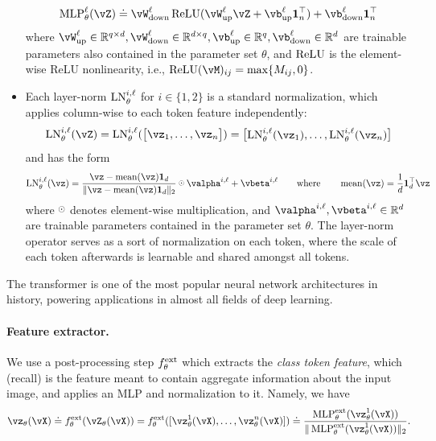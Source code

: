 \documentclass[../../book-main.tex]{subfiles}
\begin{document}
\begin{itemize}
    \begin{equation}
        \MLP_{\theta}^{\ell}(\vZ) \doteq \vW_{\down}^{\ell}\ReLU(\vW_{\up}^{\ell}\vZ + \vb_{\up}^{\ell}\vone_{n}^{\top}) + \vb_{\down}^{\ell}\vone_{n}^{\top}
    \end{equation}
    where \(\vW_{\up}^{\ell} \in \R^{q \times d}, \vW_{\down}^{\ell} \in \R^{d \times q}, \vb_{\up}^{\ell} \in \R^{q}, \vb_{\down}^{\ell} \in \R^{d}\) are trainable parameters also contained in the parameter set \(\theta\), and \(\operatorname{ReLU}\) is the element-wise ReLU nonlinearity, i.e., \(\ReLU(\vM)_{ij} = \max\{M_{ij}, 0\}\). 
    \item Each layer-norm \(\operatorname{LN}_{\theta}^{i, \ell}\) for \(i \in \{1, 2\}\) is a standard normalization, which applies column-wise to each token feature independently:
    \begin{equation}
        \LN_{\theta}^{i, \ell}(\vZ) = \LN_{\theta}^{i, \ell}(\mat{\vz_{1}, \dots, \vz_{n}}) = \mat{\LN_{\theta}^{i, \ell}(\vz_{1}), \dots, \LN_{\theta}^{i, \ell}(\vz_{n})}
    \end{equation}
    and has the form 
    \begin{equation}
        \LN_{\theta}^{i, \ell}(\vz) = \frac{\vz
        - \operatorname{mean}(\vz)\vone_{d}}{\norm{\vz
        - \operatorname{mean}(\vz)\vone_{d}}_{2}} \hada \valpha^{i, \ell} + \vbeta^{i, \ell} \qquad \text{where} \qquad \operatorname{mean}(\vz) = \frac{1}{d}\vone_{d}^{\top}\vz
    \end{equation}
    where \(\hada\) denotes element-wise multiplication, and \(\valpha^{i, \ell}, \vbeta^{i, \ell} \in \R^{d}\) are trainable parameters contained in the parameter set \(\theta\). The layer-norm operator serves as a sort of normalization on each token, where the scale of each token afterwards is learnable and shared amongst all tokens. 
\end{itemize}

The transformer is one of the most popular neural network architectures in history, powering applications in almost all fields of deep learning. 

\paragraph{Feature extractor.} We use a post-processing step \(f_{\theta}^{\mathrm{ext}}\) which extracts the \textit{class token feature}, which (recall) is the feature meant to contain aggregate information about the input image, and applies an MLP and normalization to it. Namely, we have 
\begin{equation}
    \vz_{\theta}(\vX) \doteq f_{\theta}^{\ext}(\vZ_{\theta}(\vX)) = f_{\theta}^{\ext}([\vz_{\theta}^{1}(\vX), \dots, \vz_{\theta}^{n}(\vX)]) \doteq \frac{\MLP_{\theta}^{\ext}(\vz_{\theta}^{1}(\vX))}{\norm{\MLP_{\theta}^{\ext}(\vz_{\theta}^{1}(\vX))}_{2}}.
\end{equation} 
\end{document}
